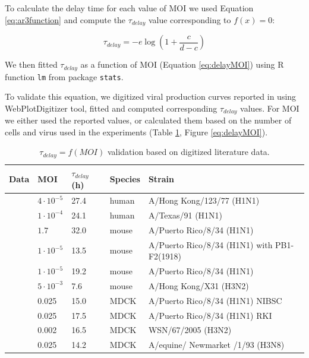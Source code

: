 To calculate the delay time for each value of MOI we used Equation \ref{eq:ar3function} and compute the $\tau_{delay}$ value corresponding to $f(x) = 0$:

\begin{equation}
\tau_{delay} = -e\log(1+\frac{c}{d-c})
\end{equation}

We then fitted $\tau_{delay}$ as a function of MOI (Equation \ref{eq:delayMOI}) using R function \texttt{lm} from package \texttt{stats}.

To validate this equation, we digitized viral production curves reported in \cite{baccam2006kinetics, handel2007neuraminidase, handel2010towards, smith2011effect, miao2010quantifying, mohler2005mathematical} using WebPlotDigitizer \cite{Rohatgi2020} tool, fitted and computed corresponding $\tau_{delay}$ values. For MOI we either used the reported values, or calculated them based on the number of cells and virus used in the experiments (Table \ref{table:delayTauValidation}, Figure \ref{eq:delayMOI}).

\begin{table}[h!]
\centering
\caption[$\tau_{delay} = f(MOI)$ validation]{$\tau_{delay} = f(MOI)$ validation based on digitized literature data.}
\label{table:delayTauValidation}

\begin{tabular}{p{2cm} p{2cm} p{2cm} p{2cm} p{4cm}}
\hline 
\textbf{Data} & \textbf{MOI} & \textbf{$\tau_{delay}$ (h)} &  \textbf{Species} & \textbf{Strain}\\
\hline
\cite{baccam2006kinetics} & $4\cdot 10^{-5}$ & 27.4 & human & A/Hong Kong/123/77 (H1N1)\\
\cite{handel2007neuraminidase} & $1\cdot 10^{-4}$ & 24.1 & human & A/Texas/91 (H1N1)\\
\hline
\cite{handel2010towards} & $1.7$ & 32.0 & mouse & A/Puerto Rico/8/34 (H1N1)\\
\cite{smith2011effect} & $1\cdot 10^{-5}$ & 13.5 & mouse & A/Puerto Rico/8/34 (H1N1) with PB1-F2(1918)\\
\cite{smith2011effect} & $1\cdot 10^{-5}$ & 19.2 & mouse & A/Puerto Rico/8/34 (H1N1)\\
\cite{miao2010quantifying} & $5\cdot 10^{-3}$ & 7.6 & mouse & A/Hong  Kong/X31 (H3N2)\\
\hline
\cite{schulze2009infection} & 0.025 & 15.0 & MDCK & A/Puerto Rico/8/34 (H1N1) NIBSC\\
\cite{schulze2009infection} & 0.025 & 17.5 & MDCK & A/Puerto Rico/8/34 (H1N1) RKI\\
\cite{schulze2009infection} & 0.002 & 16.5 & MDCK & WSN/67/2005 (H3N2)\\
\cite{mohler2005mathematical} & 0.025 & 14.2 & MDCK & A/equine/ Newmarket /1/93 (H3N8)\\
\hline
\end{tabular}
\end{table}

